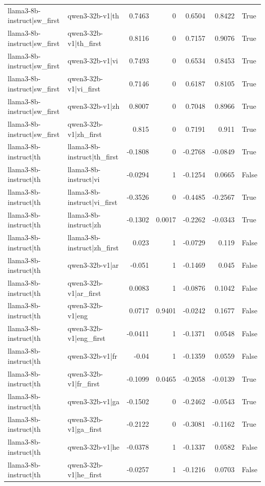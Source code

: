 \begin{table}
\begin{tabular}{l l r r r r l}
llama3-8b-instruct|sw_first & qwen3-32b-v1|th & 0.7463 & 0 & 0.6504 & 0.8422 & True \\
llama3-8b-instruct|sw_first & qwen3-32b-v1|th_first & 0.8116 & 0 & 0.7157 & 0.9076 & True \\
llama3-8b-instruct|sw_first & qwen3-32b-v1|vi & 0.7493 & 0 & 0.6534 & 0.8453 & True \\
llama3-8b-instruct|sw_first & qwen3-32b-v1|vi_first & 0.7146 & 0 & 0.6187 & 0.8105 & True \\
llama3-8b-instruct|sw_first & qwen3-32b-v1|zh & 0.8007 & 0 & 0.7048 & 0.8966 & True \\
llama3-8b-instruct|sw_first & qwen3-32b-v1|zh_first & 0.815 & 0 & 0.7191 & 0.911 & True \\
llama3-8b-instruct|th & llama3-8b-instruct|th_first & -0.1808 & 0 & -0.2768 & -0.0849 & True \\
llama3-8b-instruct|th & llama3-8b-instruct|vi & -0.0294 & 1 & -0.1254 & 0.0665 & False \\
llama3-8b-instruct|th & llama3-8b-instruct|vi_first & -0.3526 & 0 & -0.4485 & -0.2567 & True \\
llama3-8b-instruct|th & llama3-8b-instruct|zh & -0.1302 & 0.0017 & -0.2262 & -0.0343 & True \\
llama3-8b-instruct|th & llama3-8b-instruct|zh_first & 0.023 & 1 & -0.0729 & 0.119 & False \\
llama3-8b-instruct|th & qwen3-32b-v1|ar & -0.051 & 1 & -0.1469 & 0.045 & False \\
llama3-8b-instruct|th & qwen3-32b-v1|ar_first & 0.0083 & 1 & -0.0876 & 0.1042 & False \\
llama3-8b-instruct|th & qwen3-32b-v1|eng & 0.0717 & 0.9401 & -0.0242 & 0.1677 & False \\
llama3-8b-instruct|th & qwen3-32b-v1|eng_first & -0.0411 & 1 & -0.1371 & 0.0548 & False \\
llama3-8b-instruct|th & qwen3-32b-v1|fr & -0.04 & 1 & -0.1359 & 0.0559 & False \\
llama3-8b-instruct|th & qwen3-32b-v1|fr_first & -0.1099 & 0.0465 & -0.2058 & -0.0139 & True \\
llama3-8b-instruct|th & qwen3-32b-v1|ga & -0.1502 & 0 & -0.2462 & -0.0543 & True \\
llama3-8b-instruct|th & qwen3-32b-v1|ga_first & -0.2122 & 0 & -0.3081 & -0.1162 & True \\
llama3-8b-instruct|th & qwen3-32b-v1|he & -0.0378 & 1 & -0.1337 & 0.0582 & False \\
llama3-8b-instruct|th & qwen3-32b-v1|he_first & -0.0257 & 1 & -0.1216 & 0.0703 & False \\

\end{tabular}
\end{table}
